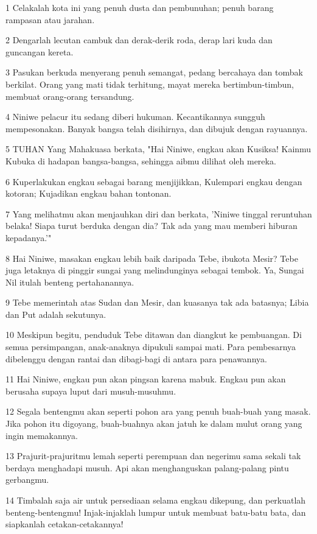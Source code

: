 \par 1 Celakalah kota ini yang penuh dusta dan pembunuhan; penuh barang rampasan atau jarahan.
\par 2 Dengarlah lecutan cambuk dan derak-derik roda, derap lari kuda dan guncangan kereta.
\par 3 Pasukan berkuda menyerang penuh semangat, pedang bercahaya dan tombak berkilat. Orang yang mati tidak terhitung, mayat mereka bertimbun-timbun, membuat orang-orang tersandung.
\par 4 Niniwe pelacur itu sedang diberi hukuman. Kecantikannya sungguh mempesonakan. Banyak bangsa telah disihirnya, dan dibujuk dengan rayuannya.
\par 5 TUHAN Yang Mahakuasa berkata, "Hai Niniwe, engkau akan Kusiksa! Kainmu Kubuka di hadapan bangsa-bangsa, sehingga aibmu dilihat oleh mereka.
\par 6 Kuperlakukan engkau sebagai barang menjijikkan, Kulempari engkau dengan kotoran; Kujadikan engkau bahan tontonan.
\par 7 Yang melihatmu akan menjauhkan diri dan berkata, 'Niniwe tinggal reruntuhan belaka! Siapa turut berduka dengan dia? Tak ada yang mau memberi hiburan kepadanya.'"
\par 8 Hai Niniwe, masakan engkau lebih baik daripada Tebe, ibukota Mesir? Tebe juga letaknya di pinggir sungai yang melindunginya sebagai tembok. Ya, Sungai Nil itulah benteng pertahanannya.
\par 9 Tebe memerintah atas Sudan dan Mesir, dan kuasanya tak ada batasnya; Libia dan Put adalah sekutunya.
\par 10 Meskipun begitu, penduduk Tebe ditawan dan diangkut ke pembuangan. Di semua persimpangan, anak-anaknya dipukuli sampai mati. Para pembesarnya dibelenggu dengan rantai dan dibagi-bagi di antara para penawannya.
\par 11 Hai Niniwe, engkau pun akan pingsan karena mabuk. Engkau pun akan berusaha supaya luput dari musuh-musuhmu.
\par 12 Segala bentengmu akan seperti pohon ara yang penuh buah-buah yang masak. Jika pohon itu digoyang, buah-buahnya akan jatuh ke dalam mulut orang yang ingin memakannya.
\par 13 Prajurit-prajuritmu lemah seperti perempuan dan negerimu sama sekali tak berdaya menghadapi musuh. Api akan menghanguskan palang-palang pintu gerbangmu.
\par 14 Timbalah saja air untuk persediaan selama engkau dikepung, dan perkuatlah benteng-bentengmu! Injak-injaklah lumpur untuk membuat batu-batu bata, dan siapkanlah cetakan-cetakannya!
